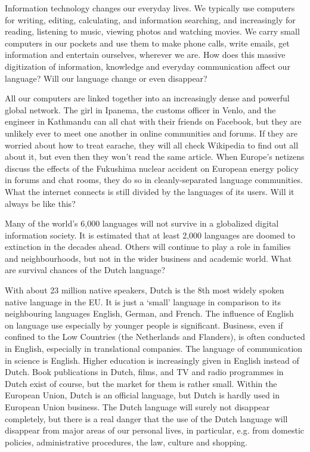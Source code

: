 \begin{multicols}{2}
Information technology changes our everyday lives. We typically use computers for writing, editing, calculating, and information searching, and increasingly for reading, listening to music, viewing photos and watching movies. We carry small computers in our pockets and use them to make phone calls, write emails, get information and entertain ourselves, wherever we are. How does this massive digitization of information, knowledge and everyday communication affect our language? Will our language change or even disappear?

All our computers are linked together into an increasingly dense and powerful global network. The girl in Ipanema, the customs officer in Venlo, and the engineer in Kathmandu can all chat with their friends on Facebook, but they are unlikely ever to meet one another in online communities and forums. If they are worried about how to treat earache, they will all check Wikipedia to find out all about it, but even then they won't read the same article. When Europe's netizens discuss the effects of the Fukushima nuclear accident on European energy policy in forums and chat rooms, they do so in cleanly-separated language communities. What the internet connects is still divided by the languages of its users. Will it always be like this?

Many of the world's 6,000 languages will not survive in a globalized digital information society. It is estimated that at least 2,000 languages are doomed to extinction in the decades ahead. Others will continue to play a role in families and neighbourhoods, but not in the wider business and academic world. What are survival chances of the Dutch language?

With about 23 million native speakers, Dutch is the 8th most widely spoken native language in the EU. It is just a `small' language in comparison to its neighbouring languages English, German, and French. The influence of English on language use especially by younger people is significant. Business, even if confined to the Low Countries (the Netherlands and Flanders), is often conducted in English, especially in translational companies. The language of communication in science is English. Higher education is increasingly given in English instead of Dutch. Book publications in Dutch, films, and TV and radio programmes in Dutch exist of course, but the market for them is rather small.  Within the European Union, Dutch is an official language, but Dutch is hardly used in European Union business. The Dutch language will surely not disappear completely, but there is a real danger that the use of the Dutch language will disappear from major areas of our personal lives, in particular, e.g. from domestic policies, administrative procedures, the law, culture and shopping.


\end{multicols}
